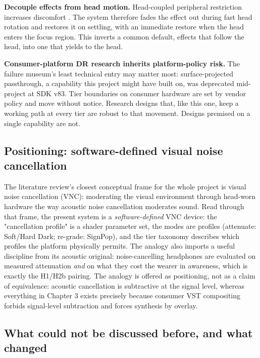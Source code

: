 \textbf{Decouple effects from head motion.} Head-coupled peripheral restriction increases discomfort
\citep{norouzi2018}. The system therefore fades the effect out during fast head rotation and
restores it on settling, with an immediate restore when the head enters the focus region. This
inverts a common default, effects that follow the head, into one that yields to the head.

\textbf{Consumer-platform DR research inherits platform-policy risk.} The failure museum's least
technical entry may matter most: surface-projected passthrough, a capability this project might have
built on, was deprecated mid-project at SDK v83. Tier boundaries on consumer hardware are set by
vendor policy and move without notice. Research designs that, like this one, keep a working path at
every tier are robust to that movement. Designs premised on a single capability are not.

\subsection{Positioning: software-defined visual noise cancellation}

The literature review's closest conceptual frame for the whole project is visual noise cancellation
(VNC): moderating the visual environment through head-worn hardware the way acoustic noise
cancellation moderates sound. Read through that frame, the present system is a \textit{software-defined}
VNC device: the "cancellation profile" is a shader parameter set, the modes are profiles
(attenuate: Soft/Hard Dark; re-grade: SignPop), and the tier taxonomy describes which profiles the
platform physically permits. The analogy also imports a useful discipline from its acoustic
original: noise-cancelling headphones are evaluated on measured attenuation \textit{and} on what they cost
the wearer in awareness, which is exactly the H1/H2b pairing. The analogy is offered as
positioning, not as a claim of equivalence: acoustic cancellation is subtractive at the signal
level, whereas everything in Chapter 3 exists precisely because consumer VST compositing forbids
signal-level subtraction and forces synthesis by overlay.

\subsection{What could not be discussed before, and what changed}

